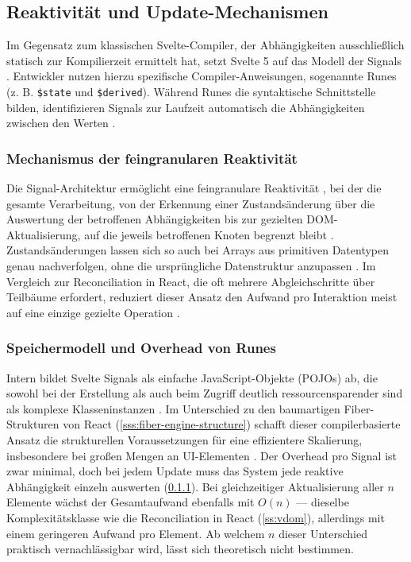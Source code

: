 \subsection{Reaktivität und Update-Mechanismen}
\label{ss:svelte-reactivity}

Im Gegensatz zum klassischen Svelte-Compiler, der Abhängigkeiten ausschließlich statisch zur Kompilierzeit ermittelt hat, setzt Svelte 5 auf das Modell der Signals \cite{svelte_runes_2023}. Entwickler nutzen hierzu spezifische Compiler-Anweisungen, sogenannte Runes (z. B. \texttt{\$state} und \texttt{\$derived}). Während Runes die syntaktische Schnittstelle bilden, identifizieren Signals zur Laufzeit automatisch die Abhängigkeiten zwischen den Werten \cite{svelte_migration}.

\subsubsection{Mechanismus der feingranularen Reaktivität}
\label{sss:finegraned-reactivity}

Die Signal-Architektur ermöglicht eine feingranulare Reaktivität \cite{svelte_runes_2023, balasubramanian-signal-2025}, bei der die gesamte Verarbeitung, von der Erkennung einer Zustandsänderung über die Auswertung der betroffenen Abhängigkeiten bis zur gezielten DOM-Aktualisierung, auf die jeweils betroffenen Knoten begrenzt bleibt \cite{svelte_runes_2023, balasubramanian-signal-2025}. Zustandsänderungen lassen sich so auch bei Arrays aus primitiven Datentypen genau nachverfolgen, ohne die ursprüngliche Datenstruktur anzupassen \cite{svelte_fine-grained_reactivity-2023}. Im Vergleich zur Reconciliation in React, die oft mehrere Abgleichschritte über Teilbäume erfordert, reduziert dieser Ansatz den Aufwand pro Interaktion meist auf eine einzige gezielte Operation \cite{putra-performance-2025}.

\subsubsection{Speichermodell und Overhead von Runes}
\label{sss:runes-overhead}

Intern bildet Svelte Signals als einfache JavaScript-Objekte (POJOs) ab, die sowohl bei der Erstellung als auch beim Zugriff deutlich ressourcensparender sind als komplexe Klasseninstanzen \cite{github-svelte_bench_13277-2024}. Im Unterschied zu den baumartigen Fiber-Strukturen von React (\cref{sss:fiber-engine-structure}) schafft dieser compilerbasierte Ansatz die strukturellen Voraussetzungen für eine effizientere Skalierung, insbesondere bei großen Mengen an UI-Elementen \cite{putra-performance-2025}. Der Overhead pro Signal ist zwar minimal, doch bei jedem Update muss das System jede reaktive Abhängigkeit einzeln auswerten (\cref{sss:finegraned-reactivity}). Bei gleichzeitiger Aktualisierung aller $n$ Elemente wächst der Gesamtaufwand ebenfalls mit $O(n)$ — dieselbe Komplexitätsklasse wie die Reconciliation in React (\cref{ss:vdom}), allerdings mit einem geringeren Aufwand pro Element. Ab welchem $n$ dieser Unterschied praktisch vernachlässigbar wird, lässt sich theoretisch nicht bestimmen.

